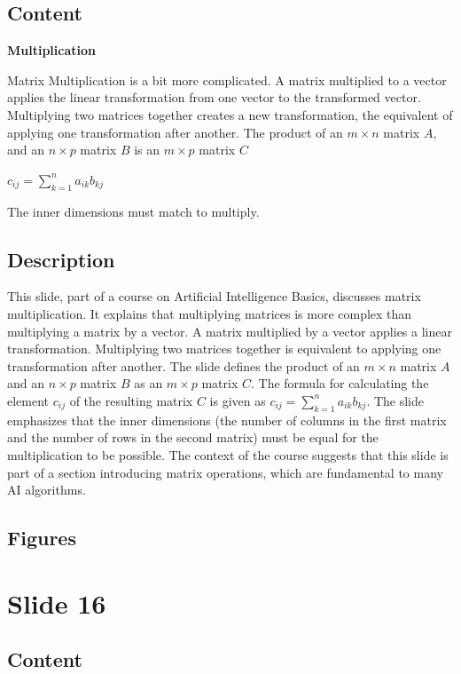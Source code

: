 \documentclass{article}%
\begin{document}
\subsection{Content}%

\textbf{Multiplication}

Matrix Multiplication is a bit more complicated. A matrix multiplied to a vector applies
the linear transformation from one vector to the transformed vector.
Multiplying two matrices together creates a new transformation, the equivalent of
applying one transformation after another.
The product of an $m \times n$ matrix $A$, and an $n \times p$ matrix $B$ is an $m \times p$ matrix $C$

$c_{ij} = \sum_{k=1}^{n} a_{ik} b_{kj}$

The inner dimensions must match to multiply.
%
\subsection{Description}%
This slide, part of a course on Artificial Intelligence Basics, discusses matrix multiplication. It explains that multiplying matrices is more complex than multiplying a matrix by a vector.  A matrix multiplied by a vector applies a linear transformation.  Multiplying two matrices together is equivalent to applying one transformation after another.  The slide defines the product of an $m \times n$ matrix $A$ and an $n \times p$ matrix $B$ as an $m \times p$ matrix $C$.  The formula for calculating the element $c_{ij}$ of the resulting matrix $C$ is given as $c_{ij} = \sum_{k=1}^{n} a_{ik} b_{kj}$.  The slide emphasizes that the inner dimensions (the number of columns in the first matrix and the number of rows in the second matrix) must be equal for the multiplication to be possible.  The context of the course suggests that this slide is part of a section introducing matrix operations, which are fundamental to many AI algorithms.%
\subsection{Figures}%
\begin{figure}[H]%
\centering%
\end{figure}

%
\newpage%
\section{Slide 16}%
\label{sec:Slide16}%
\subsection{Content}%
\end{document}

